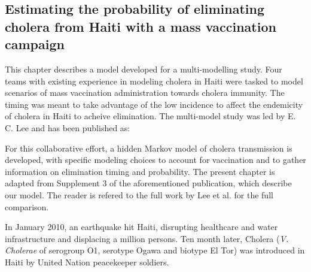 \begin{fullwidth}
\chapter[Spatial stochastic model for modeling cholera elimination]{Estimating the probability of eliminating cholera from Haiti with a mass vaccination campaign}%

This chapter describes a model developed for a multi-modelling study. Four teams with existing experience in modeling cholera in Haiti were tasked to model scenarios of mass vaccination administration towards cholera immunity. The timing was meant to take advantage of the low incidence to affect the endemicity of cholera in Haiti to acheive elimination. The multi-model study was led by E. C. Lee and has been published as:
\begin{fullwidth}
\end{fullwidth}

For this collaborative effort, a hidden Markov model of cholera transmission is developed, with specific modeling choices to account for vaccination and to gather information on elimination timing and probability.
The present chapter is adapted from Supplement 3 of the aforementioned publication, which describe our model. The reader is refered to the full work by Lee et al. for the full comparison.


\label{ch:cholera-haiti-ocv}
\end{fullwidth}
In January 2010, an earthquake hit Haiti, disrupting healthcare and water infrastructure and displacing a million persons. Ten month later, Cholera (\textit{V. Cholerae} of serogroup O1, serotype Ogawa and biotype El Tor) was introduced in Haiti by United Nation peacekeeper soldiers\cite[-3\baselineskip]{Frerichs:NepaleseOriginCholera:2012, Piarroux:UnderstandingCholeraEpidemic:2011}. 

